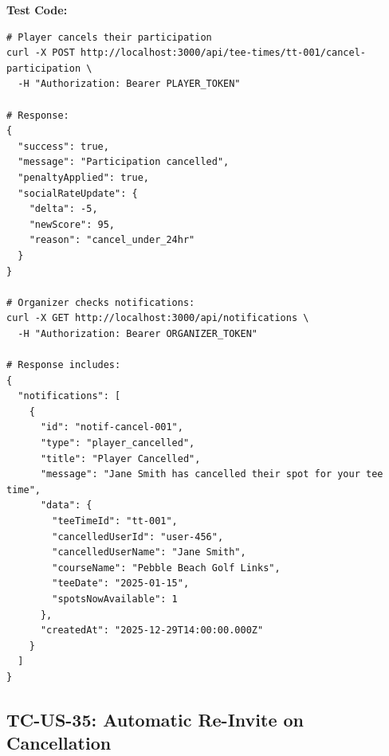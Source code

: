 \documentclass[11pt,a4paper]{article}
\begin{document}
\vspace{0.3cm}
\textbf{Test Code:}
\begin{lstlisting}
# Player cancels their participation
curl -X POST http://localhost:3000/api/tee-times/tt-001/cancel-participation \
  -H "Authorization: Bearer PLAYER_TOKEN"

# Response:
{
  "success": true,
  "message": "Participation cancelled",
  "penaltyApplied": true,
  "socialRateUpdate": {
    "delta": -5,
    "newScore": 95,
    "reason": "cancel_under_24hr"
  }
}

# Organizer checks notifications:
curl -X GET http://localhost:3000/api/notifications \
  -H "Authorization: Bearer ORGANIZER_TOKEN"

# Response includes:
{
  "notifications": [
    {
      "id": "notif-cancel-001",
      "type": "player_cancelled",
      "title": "Player Cancelled",
      "message": "Jane Smith has cancelled their spot for your tee time",
      "data": {
        "teeTimeId": "tt-001",
        "cancelledUserId": "user-456",
        "cancelledUserName": "Jane Smith",
        "courseName": "Pebble Beach Golf Links",
        "teeDate": "2025-01-15",
        "spotsNowAvailable": 1
      },
      "createdAt": "2025-12-29T14:00:00.000Z"
    }
  ]
}
\end{lstlisting}

\vspace{0.5cm}


\subsection{TC-US-35: Automatic Re-Invite on Cancellation}
\end{document}
